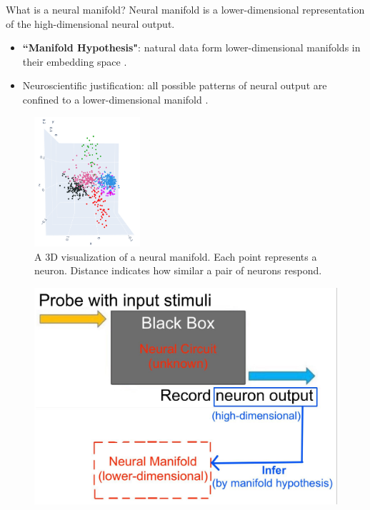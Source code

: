 \documentclass[xcolor={dvipsnames,svgnames}]{beamer}
\begin{document}
\begin{frame}{What is a neural manifold?}
Neural manifold is a lower-dimensional representation of the high-dimensional neural output.
    \begin{itemize}
        \item \textbf{``Manifold Hypothesis"}: natural data form lower-dimensional manifolds in their embedding space \cite{colah-manifold}.
        \item Neuroscientific justification: all possible patterns of neural output are confined to a lower-dimensional manifold \cite{gallego_neural_2017}.
    \end{itemize}
    
    \begin{minipage}[b][][b]{.65\linewidth}  
\begin{figure}
\includegraphics[width=0.35\textwidth]{figures/biological/retina-manifold.png}
     \caption{A 3D visualization of a neural manifold. Each point represents a neuron. Distance indicates how similar a pair of neurons respond.}
\end{figure} 
\end{minipage}
\begin{minipage}[b][][b]{.33\linewidth}   
\begin{figure}         \includegraphics[width=\textwidth]{figures/intro/black-box-1.jpg}
\caption{}
\end{figure} 
\end{minipage}
\end{frame}
\end{document}
